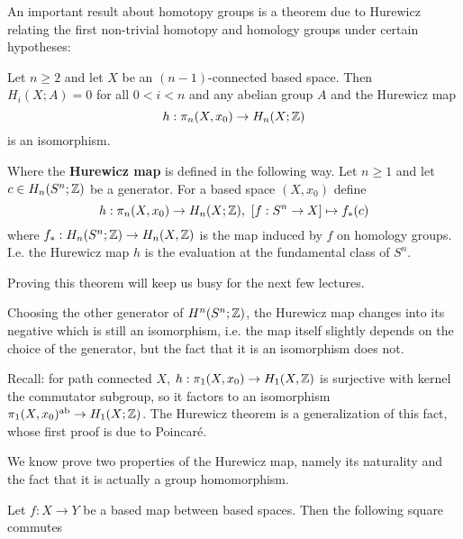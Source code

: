 An important result about homotopy groups is a theorem due to Hurewicz relating the first non-trivial homotopy and homology groups under certain hypotheses:

\begin{theorem}[Hurewicz]\label{theorem:absolute-hurewicz}
Let $n\geq2$ and let $X$ be an $(n-1)$-connected based space. Then $H_i(X;A)=0$ for all $0<i<n$ and any abelian group $A$ and the Hurewicz map
\[h:\pi_n(X,x_0)\to H_n(X;{\mathbb Z})\]
is an isomorphism.
\end{theorem}

Where the \textbf{Hurewicz map} is defined in the following way. Let $n\geq1$ and let $c\in H_n(S^n;{\mathbb Z})$ be a generator. For a based space $(X,x_0)$ define
\[h:\pi_n(X,x_0)\to H_n(X;\Z),\ [f:S^n\to X]\mapsto f_*(c)\]
where $f_*:H_n(S^n;{\mathbb Z})\to H_n(X,{\mathbb Z})$ is the map induced by $f$ on homology groups. I.e. the Hurewicz map $h$ is the evaluation at the fundamental class of $S^n$.

Proving this theorem will keep us busy for the next few lectures.

\begin{remark}
Choosing the other generator of $H^n(S^n;{\mathbb Z})$, the Hurewicz map changes into its negative which is still an isomorphism, i.e. the map itself slightly depends on the choice of the generator, but the fact that it is an isomorphism does not.
\end{remark}

\begin{remark}
Recall: for path connected $X$, $h:\pi_1(X,x_0)\to H_1(X,{\mathbb Z})$ is surjective with kernel the commutator subgroup, so it factors to an isomorphism $\pi_1(X,x_0)^{\text{ab}}\to H_1(X;{\mathbb Z})$. The Hurewicz theorem is a generalization of this fact, whose first proof is due to Poincaré.
\end{remark}

We know prove two properties of the Hurewicz map, namely its naturality and the fact that it is actually a group homomorphism.

 Let $f:X\to Y$ be a based map between based spaces. Then the following square commutes
\begin{center}
\end{center}

